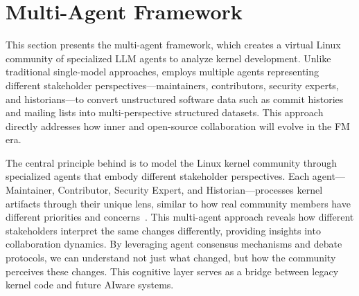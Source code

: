 \section{\sys Multi-Agent Framework}
\label{sec:methodology}

This section presents the \sys multi-agent framework, which creates a virtual Linux community of specialized LLM agents to analyze kernel development. Unlike traditional single-model approaches, \sys employs multiple agents representing different stakeholder perspectives—maintainers, contributors, security experts, and historians—to convert unstructured software data such as commit histories and mailing lists into multi-perspective structured datasets. This approach directly addresses how inner and open-source collaboration will evolve in the FM era.

The central principle behind \sys is to model the Linux kernel community through specialized agents that embody different stakeholder perspectives. Each agent—Maintainer, Contributor, Security Expert, and Historian—processes kernel artifacts through their unique lens, similar to how real community members have different priorities and concerns~\cite{ji2023survey}. This multi-agent approach reveals how different stakeholders interpret the same changes differently, providing insights into collaboration dynamics. By leveraging agent consensus mechanisms and debate protocols, we can understand not just what changed, but how the community perceives these changes. This cognitive layer serves as a bridge between legacy kernel code and future AIware systems.

